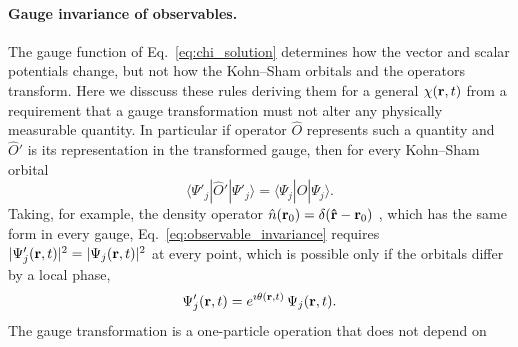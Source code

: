 \paragraph{Gauge invariance of observables.}
%
%
%
The gauge function of Eq.~\eqref{eq:chi_solution} determines how the vector and scalar potentials
change, but not how the Kohn--Sham orbitals and the operators transform.
Here we disscuss these rules deriving them for a general $\chi(\vb r,t)$ from 
a requirement that a gauge transformation must not alter any physically measurable
quantity. 
In particular  if operator $\hat O$ represents such a quantity and $\hat O'$ is its representation 
in the transformed gauge, then for every Kohn–Sham orbital
\begin{equation}
  \langle\Psi'_j|\hat O'|\Psi'_j\rangle
  =
  \langle\Psi_j|\hat O|\Psi_j\rangle.
  \label{eq:observable_invariance}
\end{equation}
Taking, for example, the density operator $\hat { n}(\vb r_0) = \delta(\vb{\hat r}-\vb r_0)$ ,
which has the same form in every gauge, Eq.~\eqref{eq:observable_invariance} 
requires $|\Psi_j'(\vb r,t)|^2 = |\Psi_j(\vb r,t)|^2$ at every point, which is
possible only if the orbitals differ by a local phase,
\begin{equation}
  \Psi_j'(\vb r,t) = e^{\imath\theta(\vb r,t)}\,\Psi_j(\vb r,t).
  \label{eq:local_phase}
\end{equation}
The gauge transformation is a one-particle operation that does not depend on
